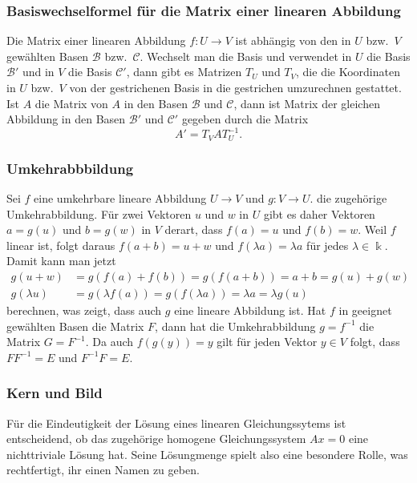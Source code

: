 \subsubsection{Basiswechselformel für die Matrix einer linearen Abbildung}
Die Matrix einer linearen Abbildung $f\colon U\to V$ ist abhängig von den
in $U$ bzw.~$V$ gewählten Basen $\mathcal{B}$ bzw.~$\mathcal{C}$.
Wechselt man die Basis und verwendet in $U$ die Basis $\mathcal{B}'$ und
in $V$ die Basis $\mathcal{C}'$, dann gibt es Matrizen
$T_U$ und $T_V$, die die Koordinaten in $U$ bzw.~$V$ von der gestrichenen
Basis in die gestrichen umzurechnen gestattet.
Ist $A$ die Matrix von $A$ in den Basen $\mathcal{B}$ und $\mathcal{C}$,
dann ist Matrix der gleichen Abbildung in den Basen $\mathcal{B}'$
und $\mathcal{C}'$ gegeben durch die Matrix
\begin{equation}
A' = T_VAT_U^{-1}.
\label{buch:vektoren-und-matrizen:eqn:basiswechselabb}
\end{equation}

\subsubsection{Umkehrabbbildung}
Sei $f$ eine umkehrbare lineare Abbildung $U\to V$ und $g\colon V\to U$.
die zugehörige Umkehrabbildung.
%
Für zwei Vektoren $u$ und $w$ in $U$ gibt es daher Vektoren $a=g(u)$
und $b=g(w)$ in $V$ derart, dass $f(a)=u$ und $f(b)=w$.
Weil $f$ linear ist, folgt daraus $f(a+b)=u+w$ und $f(\lambda a)=\lambda a$
für jedes $\lambda\in\Bbbk$.
Damit kann man jetzt
\begin{align*}
g(u+w)&=g(f(a)+f(b)) = g(f(a+b)) = a+b = g(u)+g(w)
\\
g(\lambda u) &= g(\lambda f(a))=g(f(\lambda a)) = \lambda a = \lambda g(u)
\end{align*}
berechnen, was zeigt, dass auch $g$ eine lineare Abbildung ist.
Hat $f$ in geeignet gewählten Basen die Matrix $F$, dann hat die
Umkehrabbildung $g=f^{-1}$ die Matrix $G=F^{-1}$.
Da auch $f(g(y))=y$ gilt für jeden Vektor $y\in V$ folgt, dass $FF^{-1}=E$
und $F^{-1}F=E$.

\subsubsection{Kern und Bild}
Für die Eindeutigkeit der Lösung eines linearen Gleichungssytems
ist entscheidend, ob das zugehörige homogene Gleichungssystem $Ax=0$
eine nichttriviale Lösung hat.
Seine Lösungmenge spielt also eine besondere Rolle, was rechtfertigt,
ihr einen Namen zu geben.

